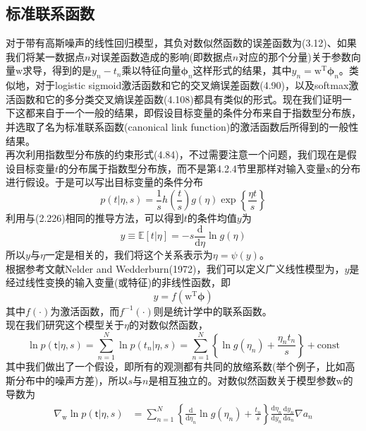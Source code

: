 \documentclass[b5paper]{book}
\numberwithin{equation}{chapter}
\newcommand {\bx} {\boldsymbol{\mathrm{x}}}
\newcommand {\bw} {\boldsymbol{\mathrm{w}}}
\newcommand {\sft} {\boldsymbol{\mathsf{t}}}
\newcommand {\rmT} {\mathrm{T}}
\newcommand {\rmd} {\mathrm{d}}
\newcommand {\bfphi} {\boldsymbol{\phi}}
\begin{document}
	\subsection{标准联系函数}
	\textnormal{对于带有高斯噪声的线性回归模型，其负对数似然函数的误差函数为(3.12)、如果我们将某一数据点$n$对误差函数造成的影响(即数据点$n$对应的那个分量)关于参数向量$\bw$求导，得到的是$y_n -t_n$乘以特征向量$\bfphi_n$这样形式的结果，其中$y_n = \bw^{\rmT}\bfphi_n$。类似地，对于logistic sigmoid激活函数和它的交叉熵误差函数(4.90)，以及softmax激活函数和它的多分类交叉熵误差函数(4.108)都具有类似的形式。现在我们证明一下这都来自于一个一般的结果，即假设目标变量的条件分布来自于指数型分布族，并选取了名为标准联系函数(canonical link function)的激活函数后所得到的一般性结果。\\
	\indent 再次利用指数型分布族的约束形式(4.84)，不过需要注意一个问题，我们现在是假设目标变量$t$的分布属于指数型分布族，而不是第4.2.4节里那样对输入变量$\bx$的分布进行假设。于是可以写出目标变量的条件分布
	\begin{equation}
		p(t|\eta, s) = \frac{1}{s}h\left(\frac{t}{s}\right)g(\eta)\exp \left\{\frac{\eta t}{s}\right\}
	\end{equation}
	利用与(2.226)相同的推导方法，可以得到$t$的条件均值$y$为
	\begin{equation}
		y \equiv \mathbb{E}[t|\eta] = -s \frac{\rmd}{\rmd \eta} \ln g(\eta)
	\end{equation}
	所以$y$与$\eta$一定是相关的，我们将这个关系表示为$\eta = \psi(y)$。\\
	\indent 根据参考文献Nelder and Wedderburn(1972)，我们可以定义广义线性模型为，$y$是经过线性变换的输入变量(或特征)的非线性函数，即
	\begin{equation}
		y = f(\bw^{\rmT} \bfphi)
	\end{equation}
	其中$f(\cdot)$为激活函数，而$f^{-1}(\cdot)$则是统计学中的联系函数。\\
	\indent 现在我们研究这个模型关于$\eta$的对数似然函数，
	\begin{equation}
		\ln p(\sft|\eta, s) = \sum_{n=1}^N \ln p(t_n|\eta,s) = \sum_{n=1}^N \left\{\ln g(\eta_n) + \frac{\eta_n t_n}{s}\right\} + \mathrm{const}
	\end{equation}
	其中我们做出了一个假设，即所有的观测都有共同的放缩系数(举个例子，比如高斯分布中的噪声方差)，所以$s$与$n$是相互独立的。对数似然函数关于模型参数$\bw$的导数为
	\begin{equation}
	\begin{split}
		\nabla_{\bw} \ln p(\sft|\eta,s) &= \sum_{n=1}^N \left\{\frac{\rmd}{\rmd \eta_n} \ln g(\eta_n) + \frac{t_n}{s}\right\} \frac{\rmd \eta_n}{\rmd y_n} \frac{\rmd y_n}{\rmd a_n} \nabla a_n \\

\end{split}
\end{equation}}
\end{document}
